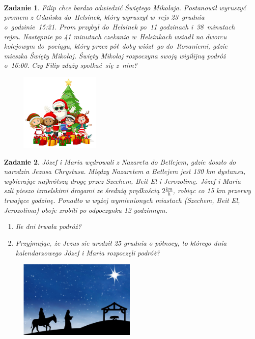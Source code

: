 \documentclass[letterpaper,10pt]{article}
\newtheorem{zad}{Zadanie}
\begin{document}
    \newpage

    ~

    ~

    ~

    \begin{zad}
        Filip chce bardzo odwiedzić Świętego Mikołaja. 
        Postanowił wyruszyć promem z Gdańska do~Helsinek, który wyruszył w~rejs 23~grudnia o~godzinie~15:21. 
        Prom przybył do~Helsinek po~11 godzinach i~38~minutach rejsu. %
        Następnie po 41 minutach czekania w~Helsinkach %
        wsiadł na dworcu kolejowym do~pociągu, który przez pół~doby wiózł~go do~Rovaniemi, gdzie mieszka Święty Mikołaj. 
        Święty Mikołaj rozpoczyna swoją wigilijną podróż o~16:00. Czy Filip zdąży spotkać~się z~nim?
    \end{zad}

    \begin{figure}[h!]
		\centering
  		\includegraphics[height=1.5in]{mikolaj1.jpg}
    \end{figure}

    \begin{zad}
        Józef i Maria wędrowali z Nazaretu do Betlejem, gdzie doszło do narodzin Jezusa Chrystusa. 
        Między Nazaretem a Betlejem jest 130 km dystansu, wybierając najkrótszą drogę przez Szechem, Beit El i Jerozolimę.
        Józef i Maria szli pieszo izraelskimi drogami ze średnią prędkością $2 \frac{km}{h}$, robiąc co 15 km przerwy trwające godzinę.
        Ponadto w wyżej wymienionych miastach (Szechem, Beit El, Jerozolima) oboje zrobili po odpoczynku 12-godzinnym.
        \begin{enumerate}[label=\alph*)]
            \item Ile dni trwała podróż?
            \item Przyjmując, że Jezus sie urodził 25 grudnia o północy, to którego dnia kalendarzowego Józef i Maria rozpoczęli podróż?
        \end{enumerate}
    \end{zad}

    \begin{figure}[h!]
		\centering
  		\includegraphics[height=1.5in]{idase2.jpg}
    \end{figure}
\end{document}

